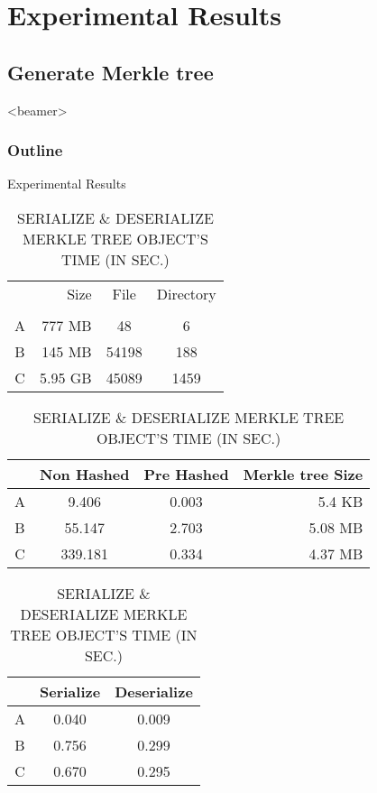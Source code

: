 \section{Experimental Results}

\subsection{Generate Merkle tree}
\begin{frame}<beamer>
    \frametitle{Outline}
    \tableofcontents[currentsubsection]
\end{frame}

\begin{frame}{Experimental Results}
	\begin{table}[]
		\scriptsize
		\centering
		\begin{tabular}{crcc}
			  & Size    & File  & Directory \\
			  &			&		&		    \\
			A & 777 MB  & 48    & 6         \\
			B & 145 MB  & 54198 & 188       \\
			C & 5.95 GB & 45089 & 1459      \\
		\end{tabular}
        
		\caption{GENERATE MERKLE TREE'S TIME (IN SEC.)}
		\begin{tabular}{|c|c|c|r|}
			\hline
              & Non Hashed & Pre Hashed & Merkle tree Size \\ \hline
            A & 9.406    & 0.003    & 5.4 KB           \\ \hline
            B & 55.147   & 2.703    & 5.08 MB          \\ \hline
            C & 339.181  & 0.334    & 4.37 MB          \\ \hline
		\end{tabular}
        
        \caption{SERIALIZE \& DESERIALIZE MERKLE TREE OBJECT'S TIME (IN SEC.)}
		\begin{tabular}{|c|c|c|}
            \hline
              & Serialize & Deserialize \\ \hline
            A & 0.040      & 0.009       \\ \hline
            B & 0.756      & 0.299       \\ \hline
            C & 0.670      & 0.295       \\ \hline
		\end{tabular}
	\end{table}
\end{frame}

